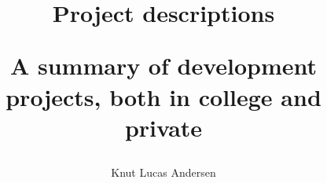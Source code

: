 \title{ 
	\begin{center} \textbf{Project descriptions} \end{center}
	\begin{center} {\large A summary of development projects, both in college and private } \end{center}
}

\author{ Knut Lucas Andersen }